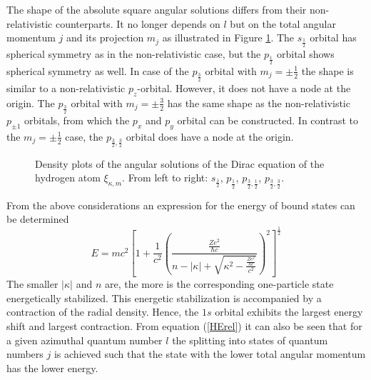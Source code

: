 The shape of the absolute square angular solutions differs from their
non-relativistic counterparts. It no longer depends on $l$ but on the total
angular momentum $j$ and its projection $m_j$ as illustrated in Figure
\ref{figure:ang_orb}. The $s_{\frac12}$ orbital has spherical symmetry as
in the non-relativistic case, but the $p_{\frac12}$ orbital shows spherical
symmetry as well. In case of the $p_{\frac32}$ orbital with $m_j=\pm \frac12$
the shape is similar to a non-relativistic $p_z$-orbital. However, it does not
have a node at the origin. The $p_{\frac32}$ orbital with $m_j=\pm \frac32$
has the same shape as the non-relativistic $p_{\pm 1}$ orbitals, from which
the $p_x$ and $p_y$ orbital can be constructed. In contrast to the
$m_j=\pm \frac12$ case, the $p_{\frac32,\frac32}$ orbital does have a node at
the origin.

\begin{figure}
\centering
     \hfill
     \hfill
   \hfill
  \raisebox{1cm}{}
\caption{Density plots of the angular solutions of the Dirac equation
         of the hydrogen atom $\xi_{\kappa,m}$. From left to right:
         $s_{\frac12}$, $p_{\frac12}$, $p_{\frac32,\frac12}$,
         $p_{\frac32,\frac32}$.}
\label{figure:ang_orb}
\end{figure}


From the above considerations an expression for the energy of bound states can be
determined
\begin{equation}\label{HErel}
E = mc^2 \left[1+ \frac1{c^2}
    \left(\frac{\frac{Ze^2}{\hbar c}}{n-|\kappa|+
         \sqrt{\kappa^2-\frac{\frac{Ze^2}{\hbar c}}{c^2}}}\right)^2
    \right]^{\frac12}
\end{equation}
The smaller $|\kappa|$ and $n$ are, the more is the corresponding one-particle
state energetically stabilized. This energetic stabilization is accompanied
by a contraction of the radial density. Hence, the $1s$ orbital exhibits the
largest energy shift and largest contraction. From equation
(\ref{HErel}) it can also be seen
that for a given azimuthal quantum number $l$ the splitting into states of quantum
numbers $j$ is achieved such that the state with the lower total angular momentum
has the lower energy.


